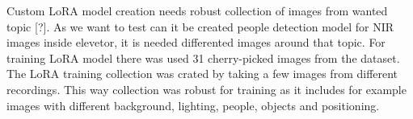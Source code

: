     
Custom LoRA model creation needs robust collection of images from wanted topic [?]. As we want to test can it be created people detection model for NIR images inside elevetor, it is needed differented images around that topic. For training LoRA model there was used 31 cherry-picked images from the dataset. The LoRA training collection was crated by taking a few images from different recordings. This way collection was robust for training as it includes for example images with different background, lighting, people, objects and positioning. 










